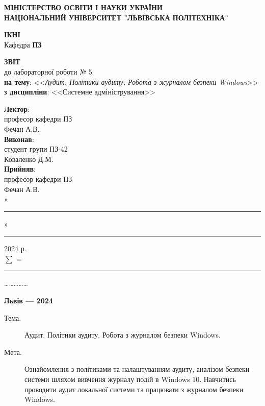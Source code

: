 \documentclass[oneside,14pt]{extarticle}
\newcommand\subject{Системне адміністрування}
\newcommand\lecturer{професор кафедри ПЗ\\Фечан А.В.}
\newcommand\teacher{професор кафедри ПЗ\\Фечан А.В.}
\newcommand\mygroup{ПЗ-42}
\newcommand\lab{5}
\newcommand\theme{Аудит. Політики аудиту. Робота з журналом безпеки
	Windows}
\newcommand\purpose{Ознайомлення з політиками та налаштуванням аудиту,
	аналізом безпеки системи шляхом вивчення журналу подій в Windows 10.
	Навчитись проводити аудит локальної системи та працювати з журналом
	безпеки Windows}
\begin{document}
\begin{normalsize}
	\begin{titlepage}
		\thispagestyle{empty}
		\begin{center}
			\textbf{МІНІСТЕРСТВО ОСВІТИ І НАУКИ УКРАЇНИ\\
				НАЦІОНАЛЬНИЙ УНІВЕРСИТЕТ "ЛЬВІВСЬКА ПОЛІТЕХНІКА"}
		\end{center}
		\begin{flushright}
			\textbf{ІКНІ}\\
			Кафедра \textbf{ПЗ}
		\end{flushright}
		\vspace{80pt}
		\begin{center}
			\textbf{ЗВІТ}\\
			\vspace{10pt}
			до лабораторної роботи № \lab\\
			\textbf{на тему}: <<\textit{\theme}>>\\
			\textbf{з дисципліни}: <<\subject>>
		\end{center}
		\vspace{80pt}
		\begin{flushright}
			
			\textbf{Лектор}:\\
			\lecturer\\
			\vspace{28pt}
			\textbf{Виконав}:\\
			
			студент групи \mygroup\\
			Коваленко Д.М.\\
			\vspace{28pt}
			\textbf{Прийняв}:\\
			
			\teacher\\
			
			\vspace{28pt}
			«\rule{1cm}{0.15mm}» \rule{1.5cm}{0.15mm} 2024 р.\\
			$\sum$ = \rule{1cm}{0.15mm}……………\\
			
		\end{flushright}
		\vspace{\fill}
		\begin{center}
			\textbf{Львів — 2024}
		\end{center}
	\end{titlepage}
		
	\begin{description}
		\item[Тема.] \theme.
		\item[Мета.] \purpose.
	\end{description}


\end{normalsize}
\end{document}
